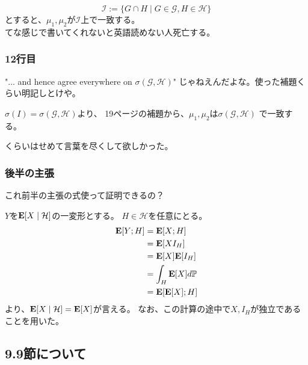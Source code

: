         \[
          \mathcal{I} := \{G \cap H \mid G \in \mathcal{G}, H \in \mathcal{H}\}
        \]
        とすると、$\mu_1 , \mu_2$が$\mathcal{I}$上で一致する。\\
        てな感じで書いてくれないと英語読めない人死亡する。

      \subsubsection{12行目}
        "... and hence agree everywhere on $\sigma(\mathcal{G},\mathcal{H})$"
        じゃねえんだよな。使った補題くらい明記しとけや。

        $\sigma(I) = \sigma(\mathcal{G},\mathcal{H})$より、
        19ページの補題から、$\mu_1 , \mu_2$は$\sigma(\mathcal{G},\mathcal{H})$
        で一致する。

        くらいはせめて言葉を尽くして欲しかった。

      \subsubsection{後半の主張}
        これ前半の主張の式使って証明できるの？

        $Y$を${\mathbf{E}}[X \mid \mathcal{H}]$の一変形とする。
        $H \in \mathcal{H}$を任意にとる。
        \begin{align*}
          {\mathbf{E}}[Y;H] &= {\mathbf{E}}[X;H] \\
          &= {\mathbf{E}}[XI_H] \\
          &= {\mathbf{E}}[X]{\mathbf{E}}[I_H] \\
          &= \int_H {\mathbf{E}}[X] d{\mathbb{P}} \\
          &= {\mathbf{E}}[{\mathbf{E}}[X];H]
        \end{align*}
        より、${\mathbf{E}}[X \mid \mathcal{H}] = {\mathbf{E}}[X]$が言える。
        なお、この計算の途中で$X,I_H$が独立であることを用いた。

    \subsection{9.9節について}
